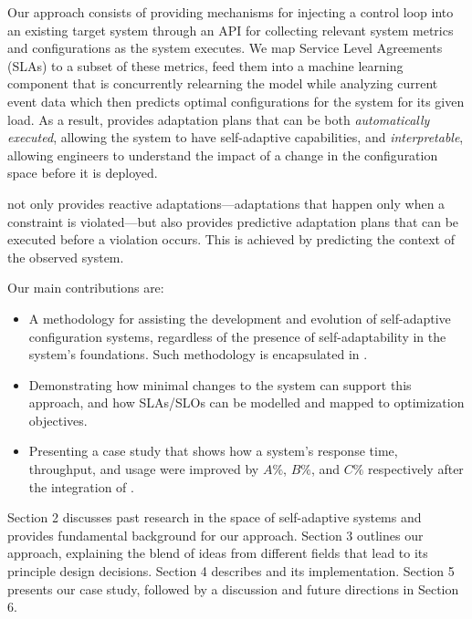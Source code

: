 Our approach consists of providing mechanisms for injecting a control loop into an existing target system through an API for collecting relevant system metrics and configurations as the system executes. We map Service Level Agreements (SLAs) to a subset of these metrics, feed them into a machine learning component that is concurrently relearning the model while analyzing current event data which then predicts optimal configurations for the system for its given load. As a result, \projectname{} provides adaptation plans that can be both \emph{automatically executed}, allowing the system to have self-adaptive capabilities, and \emph{interpretable}, allowing engineers to understand the impact of a change in the configuration space before it is deployed.

\projectname{} not only provides reactive adaptations---adaptations that happen only when a constraint is violated---but also provides predictive adaptation plans that can be executed before a violation occurs. This is achieved by predicting the context of the observed system.

Our main contributions are:

\begin{itemize}
  \item A methodology for assisting the development and evolution of self-adaptive configuration systems, regardless of the presence of self-adaptability in the system's foundations. Such methodology is encapsulated in \projectname{}.
  \item Demonstrating how minimal changes to the system can support this approach, and how SLAs/SLOs can be modelled and mapped to optimization objectives. %
  \item Presenting a case study that shows how a system's response time, throughput, and usage were improved by $A\%$, $B\%$, and $C\%$ respectively after the integration of \projectname{}.
\end{itemize}

Section 2 discusses past research in the space of self-adaptive systems and provides fundamental background for our approach. Section 3 outlines our approach, explaining the blend of ideas from different fields that lead to its principle design decisions. Section 4 describes \toolname{} and its implementation. Section 5 presents our case study, followed by a discussion and future directions in Section 6.

%


